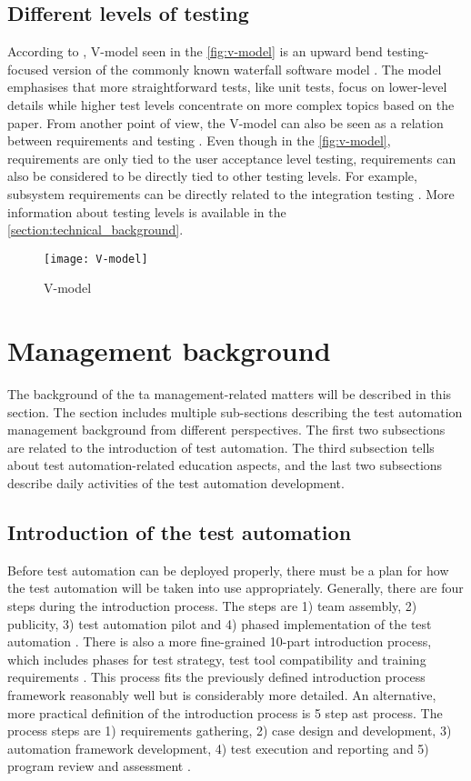 \subsection{Different levels of testing}\label{subsection:different_levels_of_testing}
According to \citeauthor{black2007pragmatic}, V-model seen in the \autoref{fig:v-model} is an upward bend testing-focused version of the commonly known waterfall software model \cite{black2007pragmatic}. The model emphasises that more straightforward tests, like unit tests, focus on lower-level details while higher test levels concentrate on more complex topics based on the paper. From another point of view, the V-model can also be seen as a relation between requirements and testing \cite{dick2017Requirements}. Even though in the \autoref{fig:v-model}, requirements are only tied to the user acceptance level testing, requirements can also be considered to be directly tied to other testing levels. For example, subsystem requirements can be directly related to the integration testing \cite{dick2017Requirements}. More information about testing levels is available in the \autoref{section:technical_background}.
\begin{figure}
	\texttt{[image: V-model]}
	\caption{V-model \cite{macario2013test}}
	\label{fig:v-model}
\end{figure}

\section{Management background}
The background of the \gls{ta} management-related matters will be described in this section. The section includes multiple sub-sections describing the test automation management background from different perspectives. The first two subsections are related to the introduction of test automation. The third subsection tells about test automation-related education aspects, and the last two subsections describe daily activities of the test automation development.

\subsection{Introduction of the test automation}
Before test automation can be deployed properly, there must be a plan for how the test automation will be taken into use appropriately. Generally, there are four steps during the introduction process. The steps are 1) team assembly, 2) publicity, 3) test automation pilot and 4) phased implementation of the test automation \cite{fewster1999software}. There is also a more fine-grained 10-part introduction process, which includes phases for test strategy, test tool compatibility and training requirements \cite{dustin1999automated}. This process fits the previously defined introduction process framework reasonably well but is considerably more detailed. An alternative, more practical definition of the introduction process is 5 step \gls{ast} process. The process steps are 1) requirements gathering, 2) case design and development, 3) automation framework development, 4) test execution and reporting and 5) program review and assessment \cite{dustin2009implementing}.

